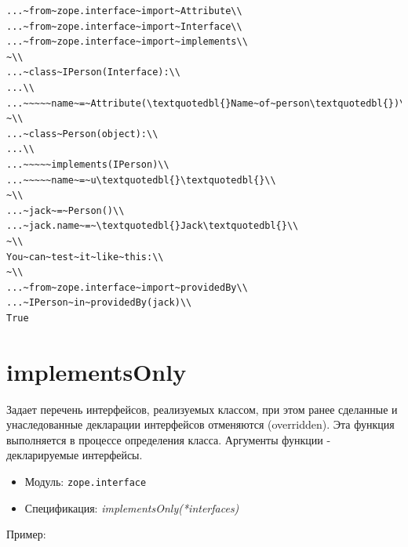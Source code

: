\documentclass[a4paper,openany,twoside,draft]{book}
\providecommand*{\DUroletitlereference}[1]{\textsl{#1}}
\begin{document}
\begin{verbatim}
...~from~zope.interface~import~Attribute\\
...~from~zope.interface~import~Interface\\
...~from~zope.interface~import~implements\\
~\\
...~class~IPerson(Interface):\\
...\\
...~~~~~name~=~Attribute(\textquotedbl{}Name~of~person\textquotedbl{})\\
~\\
...~class~Person(object):\\
...\\
...~~~~~implements(IPerson)\\
...~~~~~name~=~u\textquotedbl{}\textquotedbl{}\\
~\\
...~jack~=~Person()\\
...~jack.name~=~\textquotedbl{}Jack\textquotedbl{}\\
~\\
You~can~test~it~like~this:\\
~\\
...~from~zope.interface~import~providedBy\\
...~IPerson~in~providedBy(jack)\\
True
\end{verbatim}


\section*{implementsOnly%
  \label{implementsonly}%
}

Задает перечень интерфейсов, реализуемых классом, при этом ранее
сделанные и унаследованные декларации интерфейсов отменяются
(overridden).  Эта функция выполняется в процессе определения класса.
Аргументы функции - декларируемые интерфейсы.

\begin{itemize}

\item Модуль: \texttt{zope.interface}

\item Спецификация: \DUroletitlereference{implementsOnly(*interfaces)}

\end{itemize}

Пример:
\end{document}
